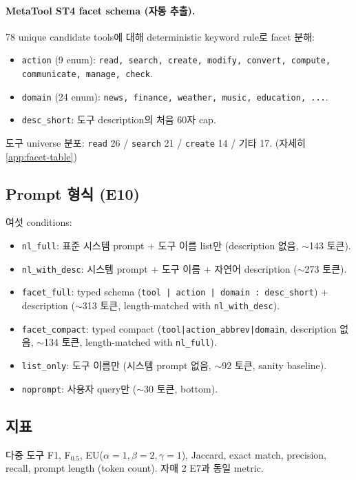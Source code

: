 \documentclass[11pt]{article}
\theoremstyle{plain}
\theoremstyle{definition}
\theoremstyle{remark}
\begin{document}
\paragraph{MetaTool ST4 facet schema (자동 추출).}
78 unique candidate tools에 대해 deterministic keyword rule로 facet 분해:
\begin{itemize}[leftmargin=*]
\item \texttt{action} (9 enum): \texttt{read, search, create, modify, convert, compute, communicate, manage, check}.
\item \texttt{domain} (24 enum): \texttt{news, finance, weather, music, education, ...}.
\item \texttt{desc\_short}: 도구 description의 처음 60자 cap.
\end{itemize}
도구 universe 분포: \texttt{read} 26 / \texttt{search} 21 / \texttt{create} 14 / 기타 17. (자세히 \cref{app:facet-table})

\subsection{Prompt 형식 (E10)}
\label{sec:prompt-formats}

여섯 conditions:
\begin{itemize}[leftmargin=*]
\item \texttt{nl\_full}: 표준 시스템 prompt + 도구 이름 list만 (description 없음, $\sim$143 토큰).
\item \texttt{nl\_with\_desc}: 시스템 prompt + 도구 이름 + 자연어 description ($\sim$273 토큰).
\item \texttt{facet\_full}: typed schema (\texttt{tool | action | domain : desc\_short}) + description ($\sim$313 토큰, length-matched with \texttt{nl\_with\_desc}).
\item \texttt{facet\_compact}: typed compact (\texttt{tool|action\_abbrev|domain}, description 없음, $\sim$134 토큰, length-matched with \texttt{nl\_full}).
\item \texttt{list\_only}: 도구 이름만 (시스템 prompt 없음, $\sim$92 토큰, sanity baseline).
\item \texttt{noprompt}: 사용자 query만 ($\sim$30 토큰, bottom).
\end{itemize}

\subsection{지표}
다중 도구 F1, F$_{0.5}$, EU($\alpha{=}1, \beta{=}2, \gamma{=}1$), Jaccard, exact match, precision, recall, prompt length (token count). 자매 2 E7과 동일 metric.
\end{document}
